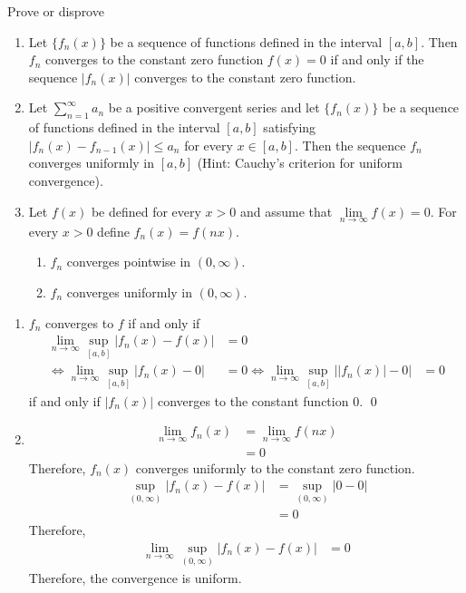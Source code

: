 \documentclass[fleqn, a4paper, 12pt, oneside]{amsart}
\theoremstyle{definition}
\theoremstyle{theorem}
\begin{document}
\begin{question}
	Prove or disprove
	\begin{enumerate}
		\item
			Let $\{f_n(x)\}$ be a sequence of functions defined in the interval $[a,b]$.
			Then $f_n$ converges to the constant zero function $f(x) = 0$ if and only if the sequence $|f_n(x)|$ converges to the constant zero function.
		\item
			Let $\sum\limits_{n = 1}^{\infty} a_n$ be a positive convergent series and let $\{f_n(x)\}$ be a sequence of functions defined in the interval $[a,b]$ satisfying $|f_n(x) - f_{n - 1}(x)| \le a_n$ for every $x \in [a,b]$.
			Then the sequence $f_n$ converges uniformly in $[a,b]$
			(Hint: Cauchy's criterion for uniform convergence).
		\item
			Let $f(x)$ be defined for every $x > 0$ and assume that $\lim\limits_{n \to \infty} f(x) = 0$.
			For every $x > 0$ define $f_n(x) = f(n x)$.
			\begin{enumerate}
				\item $f_n$ converges pointwise in $(0,\infty)$.
				\item $f_n$ converges uniformly in $(0,\infty)$.
			\end{enumerate}
	\end{enumerate}
\end{question}

\begin{solution}
	\begin{enumerate}[leftmargin = *]
		\item
			$f_n$ converges to $f$ if and only if
			\begin{align*}
				\lim\limits_{n \to \infty} \sup\limits_{[a,b]} |f_n(x) - f(x)| &= 0\\
				\iff \lim\limits_{n \to \infty} \sup\limits_{[a,b]} |f_n(x) - 0| &= 0
				\iff \lim\limits_{n \to \infty} \sup\limits_{[a,b]} \left| |f_n(x)| - 0 \right| &= 0
			\end{align*}
			if and only if $|f_n(x)|$ converges to the constant function $0$.
			\qed
		\addtocounter{enumi}{1}
		\item
			\begin{align*}
				\lim\limits_{n \to \infty} f_n(x) &= \lim\limits_{n \to \infty} f(n x)\\
				&= 0
			\end{align*}
			Therefore, $f_n(x)$ converges uniformly to the constant zero function.
			\begin{align*}
				\sup\limits_{(0,\infty)} |f_n(x) - f(x)| &= \sup\limits_{(0,\infty)} |0 - 0|\\
				&= 0
			\end{align*}
			Therefore,
			\begin{align*}
				\lim\limits_{n \to \infty} \sup\limits_{(0,\infty)} |f_n(x) - f(x)| &= 0
			\end{align*}
			Therefore, the convergence is uniform.
	\end{enumerate}
\end{solution}
\end{document}
